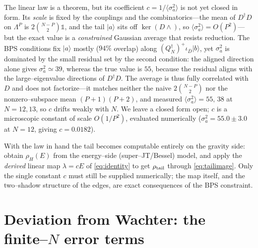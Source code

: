 \documentclass[11pt]{article}
\newcommand{\ket}[1]{\lvert #1\rangle}
\newcommand{\dg}{^{\dagger}}
\begin{document}
The linear law is a theorem, but its coefficient $c=1/\langle\sigma_a^2\rangle$ is not yet closed in
form. Its \emph{scale} is fixed by the couplings and the combinatorics---the mean of $D\dg D$ on
$\Lambda^P$ is $2\binom{N-P}{2}\mathbb 1$, and the tail $\ket a$ sits off $\ker(D\wedge)$, so
$\langle\sigma_a^2\rangle=O(P^2)$---but the exact value is a \emph{constrained} Gaussian average that
resists reduction. The BPS conditions fix $\ket a$ mostly ($94\%$ overlap) along
$(Q_N\dg)^{+}\iota_{\bar D}\ket b$, yet $\sigma_a^2$ is dominated by the small residual set by the
second condition: the aligned direction alone gives $\sigma_a^2\!\simeq\!39$, whereas the true value is
$55$, because the residual aligns with the large--eigenvalue directions of $D\dg D$. The average is thus
fully correlated with $D$ and does not factorize---it matches neither the naive $2\binom{N-P}{2}$ nor the
nonzero--subspace mean $(P{+}1)(P{+}2)$, and measured $\langle\sigma_a^2\rangle=55,\,38$ at $N=12,13$, so
$c$ drifts weakly with $N$. We leave a closed form open; $c$ is a microscopic constant of scale
$O(1/P^2)$, evaluated numerically ($\sigma_a^2=55.0\pm3.0$ at $N=12$, giving $c=0.0182$).

With the law in hand the tail becomes computable entirely on the gravity side: obtain $\rho_H(E)$ from
the energy--side (super--JT/Bessel) model, and apply the \emph{derived} linear map $\lambda=cE$ of
\eqref{eq:identity} to get $\rho_{\rm tail}$ through \eqref{eq:tailimage}. Only the single constant $c$
must still be supplied numerically; the map itself, and the two--shadow structure of the edges, are
exact consequences of the BPS constraint.

\section{Deviation from Wachter: the finite--$N$ error terms}
\label{sec:error}
\end{document}
